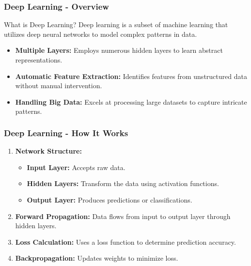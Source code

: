\documentclass{beamer}
\begin{document}
\begin{frame}[fragile]
    \frametitle{Deep Learning - Overview}
    \begin{block}{What is Deep Learning?}
        Deep learning is a subset of machine learning that utilizes deep neural networks to model complex patterns in data.
    \end{block}
    
    \begin{itemize}
        \item \textbf{Multiple Layers:} Employs numerous hidden layers to learn abstract representations.
        \item \textbf{Automatic Feature Extraction:} Identifies features from unstructured data without manual intervention.
        \item \textbf{Handling Big Data:} Excels at processing large datasets to capture intricate patterns.
    \end{itemize}
\end{frame}

\begin{frame}[fragile]
    \frametitle{Deep Learning - How It Works}
    \begin{enumerate}
        \item \textbf{Network Structure:}
            \begin{itemize}
                \item \textbf{Input Layer:} Accepts raw data.
                \item \textbf{Hidden Layers:} Transform the data using activation functions.
                \item \textbf{Output Layer:} Produces predictions or classifications.
            \end{itemize}
            
        \item \textbf{Forward Propagation:} Data flows from input to output layer through hidden layers.

        \item \textbf{Loss Calculation:} Uses a loss function to determine prediction accuracy.

        \item \textbf{Backpropagation:} Updates weights to minimize loss.
    \end{enumerate}
\end{frame}
\end{document}
